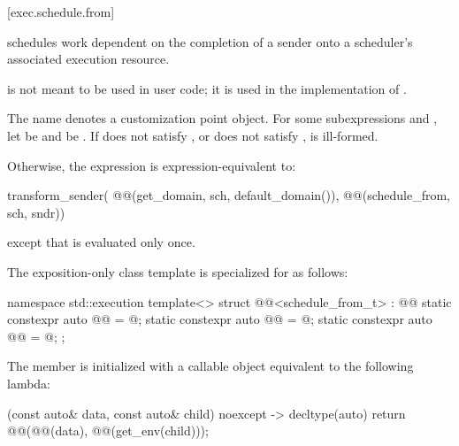 [exec.schedule.from]{}

\pnum
{} schedules work dependent on the completion of a sender
onto a scheduler's associated execution resource.
\begin{note}
 is not meant to be used in user code;
it is used in the implementation of .
\end{note}

\pnum
The name  denotes a customization point object.
For some subexpressions  and ,
let  be  and
 be .
If  does not satisfy , or
 does not satisfy ,
 is ill-formed.

\pnum
Otherwise,
the expression  is expression-equivalent to:
\begin{codeblock}
transform_sender(
  @@(get_domain, sch, default_domain()),
  @@(schedule_from, sch, sndr))
\end{codeblock}
except that  is evaluated only once.

\pnum
The exposition-only class template 
is specialized for  as follows:
\begin{codeblock}
namespace std::execution {
  template<>
  struct @@<schedule_from_t> : @@ {
    static constexpr auto @@ = @\seebelow@;
    static constexpr auto @@ = @\seebelow@;
    static constexpr auto @@ = @\seebelow@;
  };
}
\end{codeblock}

\pnum
The member 
is initialized with a callable object equivalent to the following lambda:
\begin{codeblock}
[](const auto& data, const auto& child) noexcept -> decltype(auto) {
  return @@(@@(data), @@(get_env(child)));
}
\end{codeblock}

